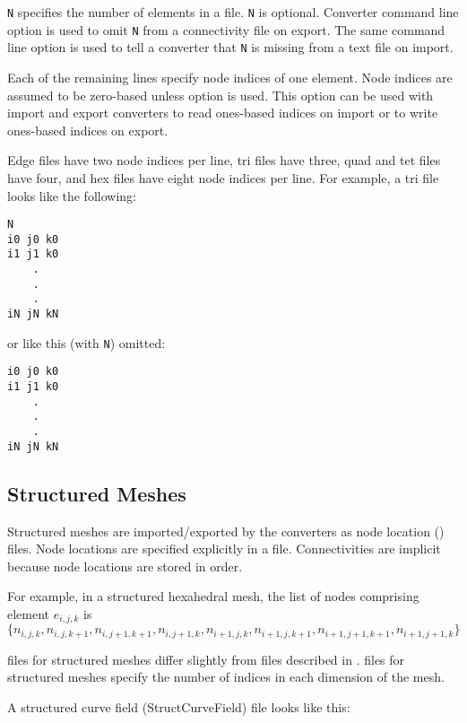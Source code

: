 \verb|N| specifies the number of elements in a file.  \verb|N| is
optional.  Converter command line option  is
used to omit \verb|N| from a connectivity file on export.  The same
command line option is used to tell a converter that \verb|N| is
missing from a text file on import.

Each of the remaining lines specify node indices of one element.
Node indices are assumed to be zero-based unless option
 is used.  This option can be used with
import and export converters to read ones-based indices on
import or to write ones-based indices on export.

Edge files have two node indices per line, tri files have three, quad
and tet files have four, and hex files have eight node indices per
line.  For example, a tri file looks like the following:

\begin{verbatim}
N
i0 j0 k0
i1 j1 k0
    .
    .
    .
iN jN kN
\end{verbatim}

or like this (with \verb|N|) omitted:

\begin{verbatim}
i0 j0 k0
i1 j1 k0
    .
    .
    .
iN jN kN
\end{verbatim}

\subsection{Structured Meshes}

Structured meshes are imported/exported by the converters as node
location () files.  Node locations are specified explicitly in a
 file. Connectivities are implicit because node locations are
stored in  order.

For example, in a structured hexahedral mesh, the list of nodes comprising
element \(e_{i,j,k}\) is \(\{n_{i,j,k}, n_{i,j,k+1}, n_{i,j+1,k+1}, n_{i,j+1,k}, n_{i+1,j,k}, n_{i+1,j,k+1}, n_{i+1,j+1,k+1}, n_{i+1,j+1,k}\}\)

 files for structured meshes differ slightly
from  files described in .   files for
structured meshes specify the number of indices in each dimension of the
mesh. 

A structured curve field (StructCurveField)  file looks
like this:

